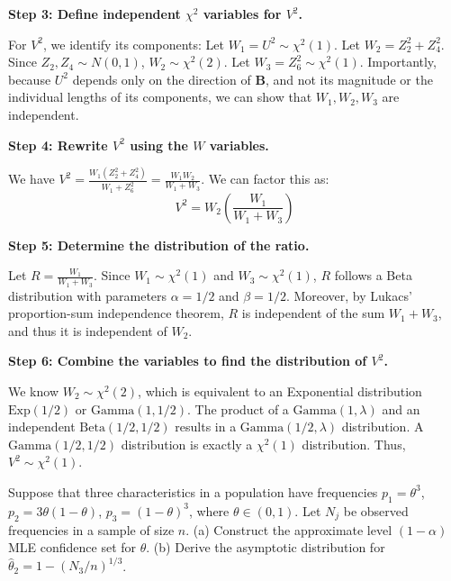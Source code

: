 \begin{solution}
\textbf{Step 3: Define independent $\chi^2$ variables for $V^2$.}

For $V^2$, we identify its components:
Let $W_1 = U^2 \sim \chi^2(1)$.
Let $W_2 = Z_2^2 + Z_4^2$. Since $Z_2, Z_4 \sim N(0, 1)$, $W_2 \sim \chi^2(2)$.
Let $W_3 = Z_6^2 \sim \chi^2(1)$.
Importantly, because $U^2$ depends only on the direction of $\mathbf{B}$, and not its magnitude or the individual lengths of its components, we can show that $W_1, W_2, W_3$ are independent.

\textbf{Step 4: Rewrite $V^2$ using the $W$ variables.}

We have $V^2 = \frac{W_1 (Z_2^2 + Z_4^2)}{W_1 + Z_6^2} = \frac{W_1 W_2}{W_1 + W_3}$.
We can factor this as:
\[ V^2 = W_2 \left( \frac{W_1}{W_1 + W_3} \right) \]

\textbf{Step 5: Determine the distribution of the ratio.}

Let $R = \frac{W_1}{W_1 + W_3}$. Since $W_1 \sim \chi^2(1)$ and $W_3 \sim \chi^2(1)$, $R$ follows a Beta distribution with parameters $\alpha = 1/2$ and $\beta = 1/2$. Moreover, by Lukacs' proportion-sum independence theorem, $R$ is independent of the sum $W_1 + W_3$, and thus it is independent of $W_2$.

\textbf{Step 6: Combine the variables to find the distribution of $V^2$.}

We know $W_2 \sim \chi^2(2)$, which is equivalent to an Exponential distribution $\text{Exp}(1/2)$ or $\text{Gamma}(1, 1/2)$.
The product of a $\text{Gamma}(1, \lambda)$ and an independent $\text{Beta}(1/2, 1/2)$ results in a $\text{Gamma}(1/2, \lambda)$ distribution.
A $\text{Gamma}(1/2, 1/2)$ distribution is exactly a $\chi^2(1)$ distribution.
Thus, $V^2 \sim \chi^2(1)$.
\end{solution}

\begin{exercise}\label{probability:2010:4}
Suppose that three characteristics in a population have frequencies $p_1 = \theta^3$, $p_2 = 3\theta(1-\theta)$, $p_3 = (1-\theta)^3$, where $\theta \in (0, 1)$. Let $N_j$ be observed frequencies in a sample of size $n$.
(a) Construct the approximate level $(1-\alpha)$ MLE confidence set for $\theta$.
(b) Derive the asymptotic distribution for $\hat{\theta}_2 = 1 - (N_3/n)^{1/3}$.
\end{exercise}

